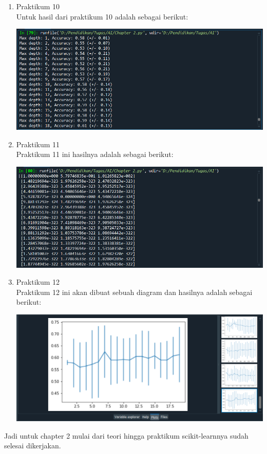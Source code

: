 \documentclass{report}
\begin{document}
\begin{enumerate}
        \item Praktikum 10
   \\\hangindent=0.5cm Untuk hasil dari praktikum 10 adalah sebagai berikut:

\includegraphics[scale=0.7]{../figures/Chapter 2 (8).PNG}    
   
        \item Praktikum 11
   \\\hangindent=0.5cm Praktikum 11 ini hasilnya adalah sebagai berikut:

\includegraphics[scale=0.7]{../figures/Chapter 2 (9).PNG}    
   
        \item Praktikum 12
   \\\hangindent=0.5cm Praktikum 12 ini akan dibuat sebuah diagram dan hasilnya adalah sebagai berikut:

\includegraphics[scale=0.7]{../figures/Chapter 2 (10).PNG}       
      
\end{enumerate}

\vspace{0.5cm}

\hangindent=0.5cm Jadi untuk chapter 2 mulai dari teori hingga praktikum scikit-learnnya sudah selesai dikerjakan.

 
\end{document}
